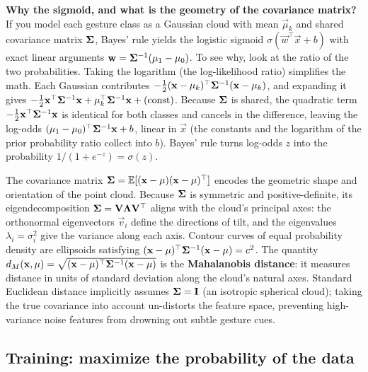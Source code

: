 \begin{whybox}
\textbf{Why the sigmoid, and what is the geometry of the covariance matrix?}
If you model each gesture class as a Gaussian cloud with mean $\vec{\mu}_k$ and shared
covariance matrix $\mathbf{\Sigma}$, Bayes' rule yields the logistic sigmoid
$\sigma(\vec{w}^\top\vec{x}+b)$ with exact linear arguments $\mathbf{w} = \mathbf{\Sigma}^{-1}(\mathbf{\mu}_1-\mathbf{\mu}_0)$.
To see why, look at the ratio of the two probabilities. Taking the logarithm (the log-likelihood ratio) simplifies the math. Each Gaussian contributes
$-\tfrac12(\mathbf{x}-\mathbf{\mu}_k)^\top\mathbf{\Sigma}^{-1}(\mathbf{x}-\mathbf{\mu}_k)$, and expanding
it gives $-\tfrac12\mathbf{x}^\top\mathbf{\Sigma}^{-1}\mathbf{x} + \mathbf{\mu}_k^\top\mathbf{\Sigma}^{-1}\mathbf{x} + (\text{const})$.
Because $\mathbf{\Sigma}$ is shared, the quadratic term $-\tfrac12\mathbf{x}^\top\mathbf{\Sigma}^{-1}\mathbf{x}$
is identical for both classes and cancels in the difference, leaving the log-odds
$(\mathbf{\mu}_1-\mathbf{\mu}_0)^\top\mathbf{\Sigma}^{-1}\mathbf{x} + b$, linear in $\vec{x}$ (the
constants and the logarithm of the prior probability ratio collect into $b$). Bayes' rule turns log-odds $z$
into the probability $1/(1+e^{-z}) = \sigma(z)$.

The covariance matrix $\mathbf{\Sigma} = \mathbb{E}[(\mathbf{x}-\mathbf{\mu})(\mathbf{x}-\mathbf{\mu})^\top]$
encodes the geometric shape and orientation of the point cloud. Because $\mathbf{\Sigma}$ is
symmetric and positive-definite, its eigendecomposition $\mathbf{\Sigma} = \mathbf{V}\mathbf{\Lambda}\mathbf{V}^\top$
aligns with the cloud's principal axes: the orthonormal eigenvectors $\vec{v}_i$ define the
directions of tilt, and the eigenvalues $\lambda_i = \sigma_i^2$ give the variance along each axis.
Contour curves of equal probability density are ellipsoids satisfying
$(\mathbf{x}-\mathbf{\mu})^\top \mathbf{\Sigma}^{-1} (\mathbf{x}-\mathbf{\mu}) = c^2$.
The quantity $d_M(\mathbf{x},\mathbf{\mu}) = \sqrt{(\mathbf{x}-\mathbf{\mu})^\top \mathbf{\Sigma}^{-1} (\mathbf{x}-\mathbf{\mu})}$
is the \textbf{Mahalanobis distance}: it measures distance in units of standard deviation along
the cloud's natural axes. Standard Euclidean distance implicitly assumes $\mathbf{\Sigma}=\mathbf{I}$
(an isotropic spherical cloud); taking the true covariance into account un-distorts the feature
space, preventing high-variance noise features from drowning out subtle gesture cues.
\end{whybox}

\subsection{Training: maximize the probability of the data}
\label{ch39:logistic-train}

